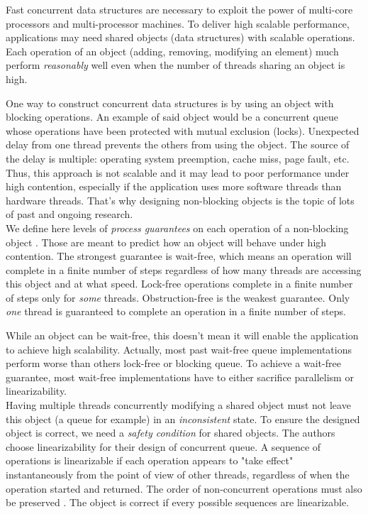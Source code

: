 Fast concurrent data structures are necessary to exploit the power of multi-core
processors and multi-processor machines. To deliver high scalable performance,
applications may need shared objects (data structures) with scalable operations.
Each operation of an object (adding, removing, modifying an element) much
perform \textit{reasonably} well even when the number of threads sharing an
object is high.

One way to construct concurrent data structures is by using an object with
blocking operations. An example of said object would be a concurrent queue whose
operations have been protected with mutual exclusion (locks). Unexpected delay
from one thread prevents the others from using the object. The source of the
delay is multiple: operating system preemption, cache miss, page fault, etc.
Thus, this approach is not scalable and it may lead to poor performance under
high contention, especially if the application uses more software threads than
hardware threads. That's why designing non-blocking objects is the topic of lots
of past and ongoing research. \\

 We define here levels of \textit{process guarantees} on
each operation of a non-blocking object \cite{Yang:2016:WQF:3016078.2851168}.
Those are meant to predict how an object will behave under high contention. The
strongest guarantee is wait-free, which means an operation will complete in a
finite number of steps regardless of how many threads are accessing this object
and at what speed. Lock-free operations complete in a finite number of steps
only for \textit{some} threads. Obstruction-free is the weakest guarantee. Only
\textit{one} thread is guaranteed to complete an operation in a finite number of
steps.

While an object can be wait-free, this doesn't mean it will enable the
application to achieve high scalability. Actually, most past wait-free queue
implementations perform worse than others lock-free or blocking queue. To
achieve a wait-free guarantee, most wait-free implementations have to either
sacrifice parallelism or linearizability. \\

 Having multiple threads concurrently modifying a shared
object must not leave this object (a queue for example) in an
\textit{inconsistent} state. To ensure the designed object is correct, we need a
\textit{safety condition} for shared objects. The authors choose linearizability
for their design of concurrent queue. A sequence of operations is linearizable
if each operation appears to "take effect" instantaneously from the point of
view of other threads, regardless of when the operation started and returned.
The order of non-concurrent operations must also be preserved
\cite{Herlihy:1990:LCC:78969.78972}. The object is correct if every possible
sequences are linearizable.

